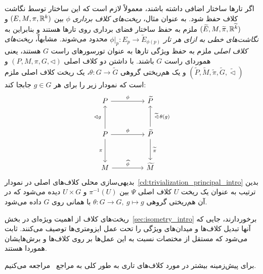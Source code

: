 اگر تارها ساختار اضافی داشته باشند، معمولاً لازم است که این ساختار توسط نگاشت کلاف حفظ شود.
به عنوان مثال، \emph{ریخت‌های کلاف برداری} $\phi$ بین $(E,M,\pi,\mathbb{R}^k)$ و $(\widetilde{E},M,\widetilde{\pi},\mathbb{R}^{\widetilde{k}})$ ملزم به حفظ ساختار فضای برداری روی تارها هستند و بنابراین به \emph{نگاشت‌های خطی به ازای هر تار $\phi|_p: E_p \to \widetilde{E}_{\phi(p)}$} محدود می‌شوند.
مشابهاً، \emph{ریخت‌های کلاف اصلی} ملزم به حفظ ویژگی تارها به عنوان تورسورهای راست $G$ هستند، یعنی هموردای راست $G$ باشند.
با داشتن دو کلاف اصلی $(P,M,\pi,G,\lhd)$ و $(\widetilde{P},\widetilde{M},\widetilde{\pi},\widetilde{G},\widetilde{\lhd})$ و یک هم‌ریختی گروهی $\theta:G \to \widetilde{G}$، یک ریخت کلاف اصلی ملزم است که نمودار زیر را برای هر $g\in G$ جابجا کند:
\begin{equation}\label{cd:principal_bundle_morphism}
\begin{tikzcd}[row sep=3.em, column sep=4.5em]
	P
			\arrow[r, "\phi"]
	& \widetilde{P}
	\\
	P
			\arrow[d, "\pi\,"']
			\arrow[r, "\phi"]
			\arrow[u, "\lhd g\ "]
	& \widetilde{P}
			\arrow[d, "\,\widetilde{\pi}"]
			\arrow[u, "\ \widetilde{\lhd}\, \theta(g)"']
	\\
	M
			\arrow[r, "\widehat{\phi}"]
	& \widetilde{M}
\end{tikzcd}
\end{equation}
بدیهی‌سازی محلی کلاف‌های اصلی در نمودار~\eqref{cd:trivialization_principal_intro} بدین ترتیب به عنوان یک ریخت $U$ کلاف اصلی $\Psi$ بین $\pi^{-1}(U)$ و $U \times G$ دیده می‌شود که در آن هم‌ریختی گروهی $\theta: G\to G,\ g\mapsto g$ با همانی روی $G$ داده می‌شود.

ریخت‌های کلاف از اهمیت ویژه‌ای در بخش~\ref{sec:isometry_intro} برخوردارند، جایی که آنها تبدیل کلاف‌ها و میدان‌های ویژگی را تحت عمل ایزومتری‌ها توصیف می‌کنند.
ثابت می‌شود که  مستقل از مختصات نسبت به این عمل‌ها بر روی کلاف‌ها و برش‌هایشان هموردا هستند.

برای پیش‌زمینه بیشتر در مورد کلاف‌های تاری به طور کلی به مراجع~\cite{schullerGeometricalAnatomy2016,nakahara2003geometry,husemollerFibreBundles1994a,steenrodTopologyFibreBundles,shoshichikobayashiFoundationsDifferentialGeometry1963,marshGaugeTheoriesFiber2016,wendlLectureNotesBundles2008} مراجعه می‌کنیم.